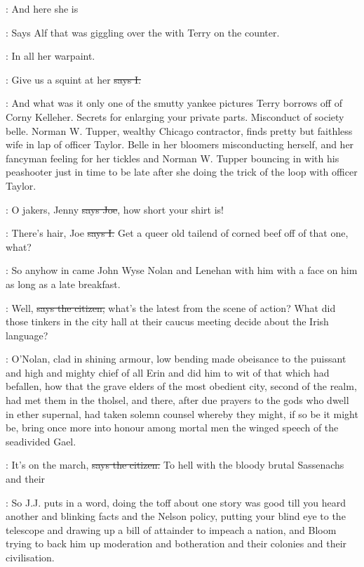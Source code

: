 \bergan:
And here she is

\Nq:
Says Alf that was giggling over the 
with Terry on the counter.

\bergan:
In all her warpaint.

:
Give us a squint at her
\sout{says I.}

\Nq:
And what was it only one of the smutty yankee pictures Terry
borrows off of Corny Kelleher.
Secrets for enlarging your private parts.
Misconduct of society belle.
Norman W.
Tupper,
wealthy Chicago
contractor,
finds pretty but faithless wife in lap of officer Taylor.
Belle in her bloomers misconducting herself,
and her fancyman feeling for
her tickles and Norman W.
Tupper bouncing in with his peashooter just in
time to be late after she doing the trick of the loop with officer Taylor.

\joe:
O jakers,
Jenny
\sout{says Joe},
how short your shirt is!

:
There's hair,
Joe
\sout{says I.}
Get a queer old tailend of corned beef off of
that one,
what?

\Nq:
So anyhow in came John Wyse Nolan and Lenehan with him with a
face on him as long as a late breakfast.

\citizen:
Well,
\sout{says the citizen,}
what's the latest from the scene of action?
What
did those tinkers in the city hall at their caucus meeting decide about
the Irish language?

:
O'Nolan,
clad in shining armour,
low bending made obeisance to the
puissant and high and mighty chief of all Erin and did him to wit of that
which had befallen,
how that the grave elders of the most obedient city,
second of the realm,
had met them in the tholsel,
and there,
after due
prayers to the gods who dwell in ether supernal,
had taken solemn counsel
whereby they might,
if so be it might be,
bring once more into honour
among mortal men the winged speech of the seadivided Gael.

\citizen:
It's on the march,
\sout{says the citizen.}
To hell with the bloody brutal
Sassenachs and their 

\Nq:
So J.J.
puts in a word,
doing the toff about one story was good till
you heard another and blinking facts and the Nelson policy,
putting your
blind eye to the telescope and drawing up a bill of attainder to impeach a
nation,
and Bloom trying to back him up moderation and botheration and
their colonies and their civilisation.

